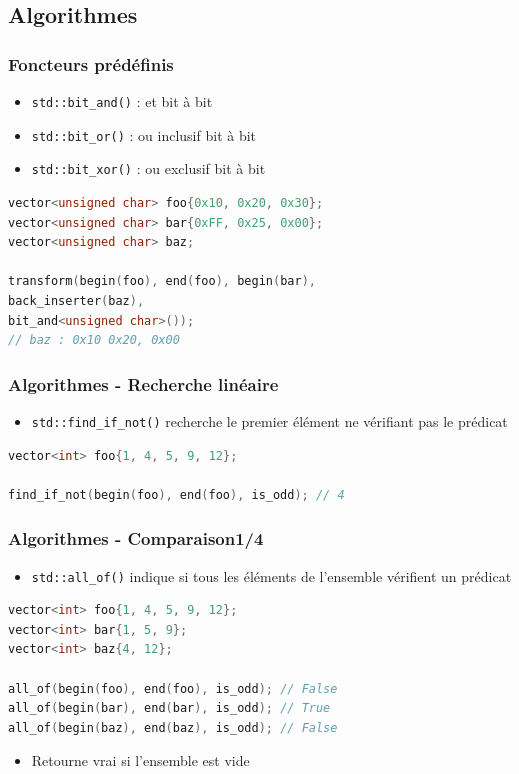 \documentclass[C++.tex]{subfiles}
\begin{document}
\subsection*{Algorithmes}
\begin{frame}[fragile]
	\frametitle{Foncteurs prédéfinis}
	\begin{itemize}
		\item \lstinline|std::bit_and()| : et bit à bit
		\item \lstinline|std::bit_or()| : ou inclusif bit à bit
		\item \lstinline|std::bit_xor()| : ou exclusif bit à bit
	\end{itemize}

	\begin{lstlisting}[language=C++]
vector<unsigned char> foo{0x10, 0x20, 0x30};
vector<unsigned char> bar{0xFF, 0x25, 0x00};
vector<unsigned char> baz;

transform(begin(foo), end(foo), begin(bar), 
back_inserter(baz), 
bit_and<unsigned char>());
// baz : 0x10 0x20, 0x00\end{lstlisting}
\end{frame}

\begin{frame}[fragile]
	\frametitle{Algorithmes - Recherche linéaire}
	\begin{itemize}
		\item \lstinline|std::find_if_not()| recherche le premier élément ne vérifiant pas le prédicat
	\end{itemize}

	\begin{lstlisting}[language=C++]
vector<int> foo{1, 4, 5, 9, 12};

find_if_not(begin(foo), end(foo), is_odd); // 4\end{lstlisting}

\end{frame}

\begin{frame}[fragile]
	\frametitle{Algorithmes - Comparaison\titlehfill{}1/4}
	\begin{itemize}
		\item \lstinline|std::all_of()| indique si tous les éléments de l'ensemble vérifient un prédicat
	\end{itemize}

	\begin{lstlisting}[language=C++]
vector<int> foo{1, 4, 5, 9, 12};
vector<int> bar{1, 5, 9};
vector<int> baz{4, 12};

all_of(begin(foo), end(foo), is_odd); // False
all_of(begin(bar), end(bar), is_odd); // True
all_of(begin(baz), end(baz), is_odd); // False\end{lstlisting}

	\begin{itemize}
		\item Retourne vrai si l'ensemble est vide
	\end{itemize}
\end{frame}
\end{document}
